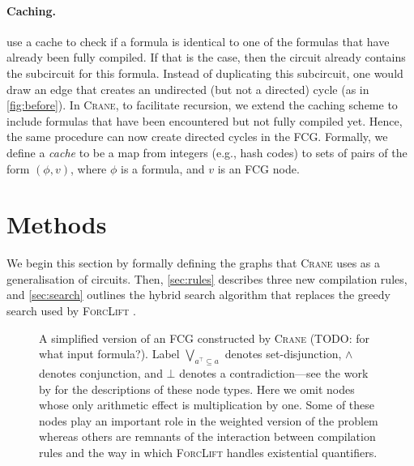 \paragraph*{Caching.}
\citet{DBLP:conf/ijcai/BroeckTMDR11} use a cache to check if a formula is
identical to one of the formulas that have already been fully compiled. If that
is the case, then the circuit already contains the subcircuit for this formula.
Instead of duplicating this subcircuit, one would draw an edge that creates an
undirected (but not a directed) cycle (as in \cref{fig:before}). In
\textsc{Crane}, to facilitate recursion, we extend the caching scheme to include
formulas that have been encountered but not fully compiled yet. Hence, the same
procedure can now create directed cycles in the FCG\@. Formally, we define a
\emph{cache} to be a map from integers (e.g., hash codes) to sets of pairs of
the form $(\phi, v)$, where $\phi$ is a formula, and $v$ is an FCG node.

\section{Methods}\label{sec:methods}

We begin this section by formally defining the graphs that \textsc{Crane} uses
as a generalisation of circuits. Then, \cref{sec:rules} describes three new
compilation rules, and \cref{sec:search} outlines the hybrid search algorithm
that replaces the greedy search used by \textsc{ForcLift}
\citep{DBLP:conf/ijcai/BroeckTMDR11}.

\begin{figure}[t]
  \centering
  \caption{A simplified version of an FCG constructed by \textsc{Crane} (TODO:
    for what input formula?). Label $\bigvee_{a^\top \subseteq a}$ denotes
    set-disjunction, $\land$ denotes conjunction, and $\bot$ denotes a
    contradiction---see the work by \citet{DBLP:conf/ijcai/BroeckTMDR11} for the
    descriptions of these node types. Here we omit nodes whose only arithmetic
    effect is multiplication by one. Some of these nodes play an important role
    in the weighted version of the problem whereas others are remnants of the
    interaction between compilation rules and the way in which \textsc{ForcLift}
    handles existential quantifiers.}\label{fig:examplefcg}
\end{figure}

